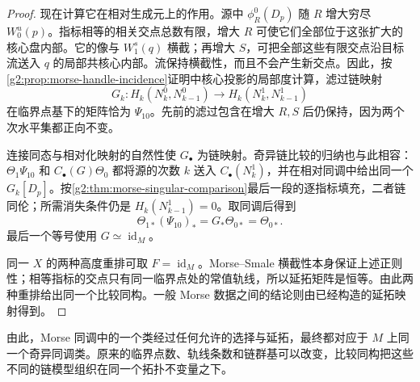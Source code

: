 \begin{proof}
	现在计算它在相对生成元上的作用。源中 \(\phi_R^0(D_p)\) 随 \(R\) 增大穷尽 \(W^u_0(p)\)。指标相等的相关交点总数有限，增大 \(R\) 可使它们全部位于这张扩大的核心盘内部。它的像与 \(W^s_1(q)\) 横截；再增大 \(S\)，可把全部这些有限交点沿目标流送入 \(q\) 的局部共核心内部。流保持横截性，而且不会产生新交点。因此，按\cref{g2:prop:morse-handle-incidence}证明中核心投影的局部度计算，滤过链映射
	\[
		G_k:H_k(N^0_k,N^0_{k-1})\longrightarrow H_k(N^1_k,N^1_{k-1})
	\]
	在临界点基下的矩阵恰为 \(\Psi_{10}\)。先前的滤过包含在增大 \(R,S\) 后仍保持，因为两个次水平集都正向不变。

	连接同态与相对化映射的自然性使 \(G_\bullet\) 为链映射。奇异链比较的归纳也与此相容：\(\Theta_1\Psi_{10}\) 和 \(C_\bullet(G)\Theta_0\) 都将源的次数 \(k\) 送入 \(C_\bullet(N^1_k)\)，并在相对同调中给出同一个 \(G_k[D_p]\)。按\cref{g2:thm:morse-singular-comparison}最后一段的逐指标填充，二者链同伦；所需消失条件仍是 \(H_k(N^1_{k-1})=0\)。取同调后得到
	\[
		\Theta_{1*}(\Psi_{10})_*=G_*\Theta_{0*}=\Theta_{0*}.
	\]
	最后一个等号使用 \(G\simeq\operatorname{id}_M\)。

	同一 \(X\) 的两种高度重排可取 \(F=\operatorname{id}_M\)。Morse--Smale 横截性本身保证上述正则性；相等指标的交点只有同一临界点处的常值轨线，所以延拓矩阵是恒等。由此两种重排给出同一个比较同构。一般 Morse 数据之间的结论则由已经构造的延拓映射得到。
\end{proof}

由此，Morse 同调中的一个类经过任何允许的选择与延拓，最终都对应于 \(M\) 上同一个奇异同调类。原来的临界点数、轨线条数和链群基可以改变，比较同构把这些不同的链模型组织在同一个拓扑不变量之下。

